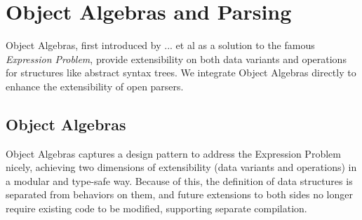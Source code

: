 \section{Object Algebras and Parsing}\label{sec:algebrasandparsing}

Object Algebras, first introduced by ... et al as a solution to the famous \textit{Expression Problem}, provide extensibility on
both data variants and operations for structures like abstract syntax trees. We integrate Object Algebras directly to enhance the
extensibility of open parsers.

\subsection{Object Algebras}\label{subsec:objectalgebras}
Object Algebras captures a design pattern to address the Expression Problem nicely,
achieving two dimensions of extensibility (data variants and operations) in a modular and type-safe way.
Because of this, the definition of data structures is separated from behaviors on them, and future extensions
to both sides no longer require existing code to be modified, supporting separate compilation.

